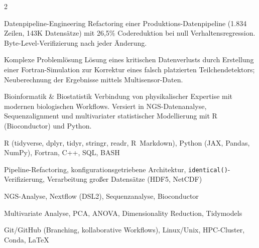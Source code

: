 \documentclass{thejus_cv}
\begin{document}
\begin{paracol}{2}
\switchcolumn



\cvstrength{\faStar}
           {Datenpipeline-Engineering}
           {Refactoring einer Produktions-Datenpipeline (1.834 Zeilen, 143K Datens\"atze) mit 26,5\% Codereduktion bei null Verhaltensregression. Byte-Level-Verifizierung nach jeder \"Anderung.}

\cvstrength{\faLightbulb}
           {Komplexe Probleml\"osung}
           {L\"osung eines kritischen Datenverlusts durch Erstellung einer Fortran-Simulation zur Korrektur eines falsch platzierten Teilchendetektors; Neuberechnung der Ergebnisse mittels Multisensor-Daten.}

\cvstrength{\faAward}
           {Bioinformatik \& Biostatistik}
           {Verbindung von physikalischer Expertise mit modernen biologischen Workflows. Versiert in NGS-Datenanalyse, Sequenzalignment und multivariater statistischer Modellierung mit R (Bioconductor) und Python.}


         {R (tidyverse, dplyr, tidyr, stringr, readr, R~Markdown), Python (JAX, Pandas, NumPy), Fortran, C++, SQL, BASH}

         {Pipeline-Refactoring, konfigurationsgetriebene Architektur, \texttt{identical()}-Verifizierung, Verarbeitung gro{\ss}er Datens\"atze (HDF5, NetCDF)}

         {NGS-Analyse, Nextflow (DSL2), Sequenzanalyse, Bioconductor}

         {Multivariate Analyse, PCA, ANOVA, Dimensionality Reduction, Tidymodels}

         {Git/GitHub (Branching, kollaborative Workflows), Linux/Unix, HPC-Cluster, Conda, LaTeX}






\end{paracol}
\end{document}
